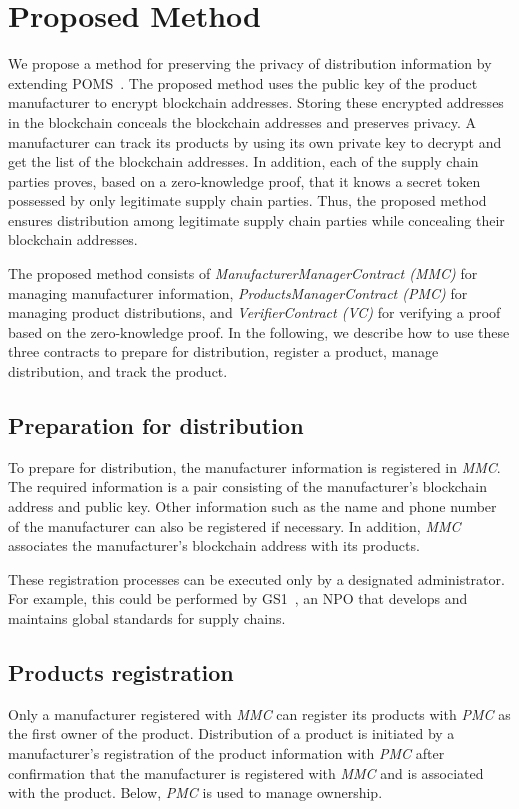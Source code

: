 \documentclass[conference]{IEEEtran}
\begin{document}
\section{Proposed Method}
\label{sec:proposed_method}

We propose a method for preserving the privacy of distribution information by extending POMS~\cite{Toyoda2017}.
The proposed method uses the public key of the product manufacturer to encrypt blockchain addresses.
Storing these encrypted addresses in the blockchain conceals the blockchain addresses and preserves privacy.
A manufacturer can track its products by using its own private key to decrypt and get the list of the blockchain addresses.
In addition, each of the supply chain parties proves, based on a zero-knowledge proof, that it knows a secret token possessed by only legitimate supply chain parties.
Thus, the proposed method ensures distribution among legitimate supply chain parties while concealing their blockchain addresses.

The proposed method consists of \textit{ManufacturerManagerContract (MMC)} for managing manufacturer information, \textit{ProductsManagerContract (PMC)} for managing product distributions, and \textit{VerifierContract (VC)} for verifying a proof based on the zero-knowledge proof.
In the following, we describe how to use these three contracts to prepare for distribution, register a product, manage distribution, and track the product.

\subsection{Preparation for distribution}
To prepare for distribution, the manufacturer information is registered in \textit{MMC}.
The required information is a pair consisting of the manufacturer's blockchain address and public key.
Other information such as the name and phone number of the manufacturer can also be registered if necessary.
In addition, \textit{MMC} associates the manufacturer's blockchain address with its products.

These registration processes can be executed only by a designated administrator.
For example, this could be performed by GS1~\cite{GS1}, an NPO that develops and maintains global standards for supply chains.



\subsection{Products registration}
Only a manufacturer registered with \textit{MMC} can register its products with \textit{PMC} as the first owner of the product.
Distribution of a product is initiated by a manufacturer's registration of the product information with \textit{PMC} after confirmation that the manufacturer is registered with \textit{MMC} and is associated with the product.
Below, \textit{PMC} is used to manage ownership.
\end{document}
